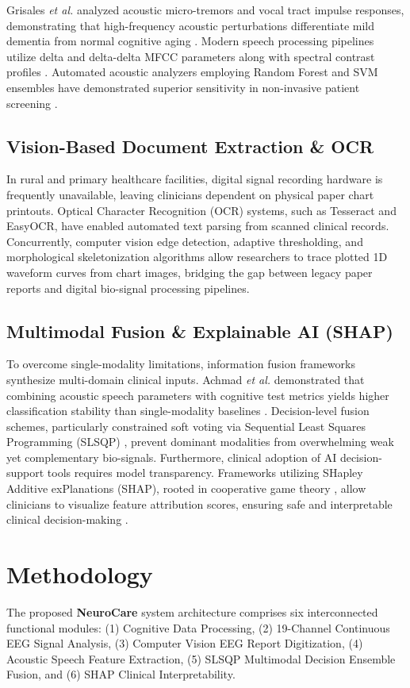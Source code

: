 \documentclass[conference]{IEEEtran}
\begin{document}
Grisales \textit{et al.} analyzed acoustic micro-tremors and vocal tract impulse responses, demonstrating that high-frequency acoustic perturbations differentiate mild dementia from normal cognitive aging \cite{grisales2021}. Modern speech processing pipelines utilize delta and delta-delta MFCC parameters \cite{lopez2018} along with spectral contrast profiles \cite{pulido2020}. Automated acoustic analyzers employing Random Forest and SVM ensembles have demonstrated superior sensitivity in non-invasive patient screening \cite{konig2015}.

\subsection{Vision-Based Document Extraction \& OCR}
In rural and primary healthcare facilities, digital signal recording hardware is frequently unavailable, leaving clinicians dependent on physical paper chart printouts. Optical Character Recognition (OCR) systems, such as Tesseract \cite{smith2018} and EasyOCR, have enabled automated text parsing from scanned clinical records. Concurrently, computer vision edge detection, adaptive thresholding, and morphological skeletonization algorithms \cite{bradski2008} allow researchers to trace plotted 1D waveform curves from chart images, bridging the gap between legacy paper reports and digital bio-signal processing pipelines.

\subsection{Multimodal Fusion \& Explainable AI (SHAP)}
To overcome single-modality limitations, information fusion frameworks synthesize multi-domain clinical inputs. Achmad \textit{et al.} demonstrated that combining acoustic speech parameters with cognitive test metrics yields higher classification stability than single-modality baselines \cite{achmad2023}. Decision-level fusion schemes, particularly constrained soft voting via Sequential Least Squares Programming (SLSQP) \cite{chen2022}, prevent dominant modalities from overwhelming weak yet complementary bio-signals. Furthermore, clinical adoption of AI decision-support tools requires model transparency. Frameworks utilizing SHapley Additive exPlanations (SHAP), rooted in cooperative game theory \cite{lundberg2017}, allow clinicians to visualize feature attribution scores, ensuring safe and interpretable clinical decision-making \cite{liu2023}.

\section{Methodology}
The proposed \textbf{NeuroCare} system architecture comprises six interconnected functional modules: (1) Cognitive Data Processing, (2) 19-Channel Continuous EEG Signal Analysis, (3) Computer Vision EEG Report Digitization, (4) Acoustic Speech Feature Extraction, (5) SLSQP Multimodal Decision Ensemble Fusion, and (6) SHAP Clinical Interpretability.
\end{document}
